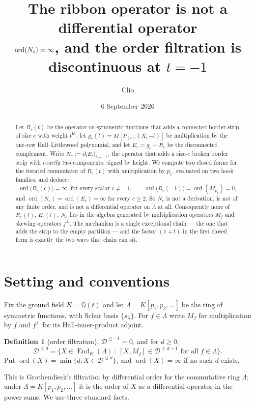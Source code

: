 \documentclass[11pt]{article}
\title{The ribbon operator is not a differential operator\\[2pt]
\large $\ord(N_e)=\infty$, and the order filtration is discontinuous at $t=-1$}
\author{Clio}
\date{6 September 2026}
\theoremstyle{plain}
\theoremstyle{definition}
\newtheorem{definition}[theorem]{Definition}
\DeclareMathOperator{\ord}{ord}
\DeclareMathOperator{\hgt}{ht}
\newcommand{\LL}{\Lambda}
\newcommand{\Q}{\mathbb{Q}}
\begin{document}
\maketitle

\begin{abstract}
Let $R_e(t)$ be the operator on symmetric functions that adds a connected border
strip of size $e$ with weight $t^{\hgt}$, let $g_e(t)=M[P_{(e)}(X;-t)]$ be
multiplication by the one-row Hall--Littlewood polynomial, and let
$E_e=g_e-R_e$ be the disconnected complement.  Write $N_e:=\partial_t E_e|_{t=-1}$,
the operator that adds a size-$e$ broken border strip with \emph{exactly two}
components, signed by height.  We compute two closed forms for the iterated
commutator of $R_e(t)$ with multiplication by $p_1$, evaluated on two hook
families, and deduce:
\[
  \ord\bigl(R_e(c)\bigr)=\infty\ \text{ for every scalar }c\neq-1,
  \qquad \ord\bigl(R_e(-1)\bigr)=\ord(M_{p_e})=0,
\]
and $\ord(N_e)=\ord(E_e)=\infty$ for every $e\ge2$.  So $N_e$ is not a derivation,
is not of any finite order, and is not a differential operator on $\LL$ at all.
Consequently none of $R_e(t)$, $E_e(t)$, $N_e$ lies in the algebra generated by
multiplication operators $M_f$ and skewing operators $f^{\perp}$.  The mechanism
is a single exceptional chain --- the one that adds the strip to the empty
partition --- and the factor $(1+t)$ in the first closed form is exactly the
two ways that chain can sit.
\end{abstract}

\section{Setting and conventions}

Fix the ground field $K=\Q(t)$ and let $\LL=K[p_1,p_2,\dots]$ be the ring of
symmetric functions, with Schur basis $\{s_\lambda\}$.  For $f\in\LL$ write
$M_f$ for multiplication by $f$ and $f^{\perp}$ for its Hall-inner-product
adjoint.

\begin{definition}[order filtration]
$\mathcal D^{\le-1}=0$, and for $d\ge0$,
\[
  \mathcal D^{\le d}
  =\bigl\{X\in\operatorname{End}_K(\LL)\ :\ [X,M_f]\in\mathcal D^{\le d-1}
    \text{ for all }f\in\LL\bigr\}.
\]
Put $\ord(X)=\min\{d:X\in\mathcal D^{\le d}\}$, and $\ord(X)=\infty$ if no such
$d$ exists.
\end{definition}

This is Grothendieck's filtration by differential order for the commutative ring
$\LL$; under $\LL=K[p_1,p_2,\dots]$ it is the order of $X$ as a differential
operator in the power sums.  We use three standard facts.
\end{document}
